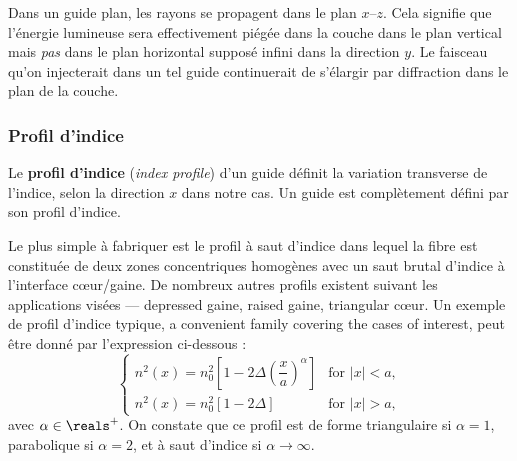 \begin{remark}
  Dans un guide plan, les rayons se propagent dans le plan $x$--$z$. Cela
  signifie que l'énergie lumineuse sera effectivement piégée dans la couche
  dans le plan vertical mais \emph{pas} dans le plan horizontal supposé infini
  dans la direction $y$. Le faisceau qu'on injecterait dans un tel guide
  continuerait de s'élargir par diffraction dans le plan de la couche.
\end{remark}

\subsubsection{Profil d'indice}
\begin{definition}
  Le \textbf{profil d'indice} (\textit{index profile}) d'un guide définit la
  variation transverse de l'indice, selon la direction $x$ dans notre cas. Un
  guide est complètement défini par son profil d'indice.
\end{definition}

Le plus simple à fabriquer est le profil à saut d'indice dans lequel la fibre
est constituée de deux zones concentriques homogènes avec un saut brutal
d'indice à l'interface cœur/gaine. De nombreux autres profils existent suivant
les applications visées --- depressed gaine, raised gaine, triangular
cœur. Un exemple de profil d'indice typique, a convenient family covering the
cases of interest, peut être donné par l'expression ci-dessous :
\begin{equation*}
  \begin{cases}
    n^2(x) = n_0^2\left[1 - 2\Delta\left(\dfrac{x}{a}\right)^{\alpha}\right]
      & \text{for } |x| < a,\\[2ex]
    n^2(x) = n_0^2\left[1 - 2\Delta\right] & \text{for } |x| > a,
  \end{cases}
\end{equation*}
avec $\alpha \in \reals^{+}$. On constate que ce profil est de forme
triangulaire si $\alpha = 1$, parabolique si $\alpha = 2$, et à saut d'indice si
$\alpha \rightarrow \infty$.

